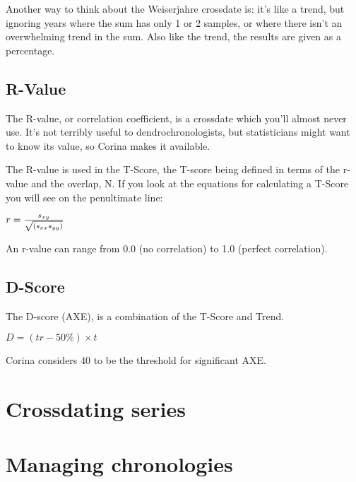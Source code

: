 Another way to think about the Weiserjahre crossdate is: it's like a trend, but ignoring years where the sum has only 1 or 2 samples, or where there isn't an overwhelming trend in the sum. Also like the trend, the results are given as a percentage.


\subsection{R-Value}
The R-value, or correlation coefficient, is a crossdate which you'll almost never use. It's not terribly useful to dendrochronologists, but statisticians might want to know its value, so Corina makes it available.

The R-value is used in the T-Score, the T-score being defined in terms of the r-value and the overlap, N. If you look at the equations for calculating a T-Score you will see on the penultimate line: 

\begin{itemize*}
 \item $r = {s_{xy} \over \sqrt{(s_{xx} s_{yy})}}$
\end{itemize*}

An r-value can range from 0.0 (no correlation) to 1.0 (perfect correlation). 
 
\subsection{D-Score }

The D-score (AXE), is a combination of the T-Score and Trend.

\begin{itemize*}
 \item $D = (tr - 50\%) \times t $
\end{itemize*}

Corina considers 40 to be the threshold for significant AXE. 

\section{Crossdating series}


\section{Managing chronologies}
